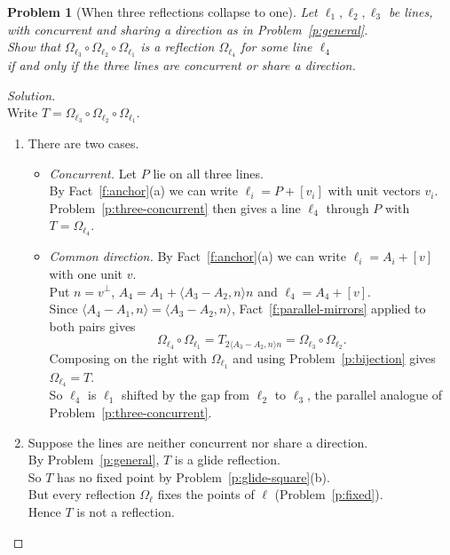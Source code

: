 \documentclass[11pt,a4paper]{article}
\theoremstyle{boxed}
\newtheorem{problem}{Problem}
\theoremstyle{definition}
\newenvironment{solution}{\begin{proof}[Solution]}{\end{proof}}
\newcommand{\ip}[2]{\langle #1, #2 \rangle}
\begin{document}
\begin{problem}[When three reflections collapse to one]\label{p:collapse}
Let $\ell_1,\ell_2,\ell_3$ be lines, with concurrent and sharing a direction as in Problem~\ref{p:general}.\\
Show that $\Omega_{\ell_3}\circ\Omega_{\ell_2}\circ\Omega_{\ell_1}$ is a reflection $\Omega_{\ell_4}$ for some line $\ell_4$\\
if and only if the three lines are concurrent or share a direction.
\end{problem}

\begin{solution}
\leavevmode\\
Write $T=\Omega_{\ell_3}\circ\Omega_{\ell_2}\circ\Omega_{\ell_1}$.
\begin{enumerate}[leftmargin=2.5em]
    \item[($\Leftarrow$)] There are two cases.
    \begin{itemize}[nosep]
        \item \emph{Concurrent.} Let $P$ lie on all three lines.\\
        By Fact~\ref{f:anchor}(a) we can write $\ell_i=P+[v_i]$ with unit vectors $v_i$.\\
        Problem~\ref{p:three-concurrent} then gives a line $\ell_4$ through $P$ with $T=\Omega_{\ell_4}$.
        \item \emph{Common direction.} By Fact~\ref{f:anchor}(a) we can write $\ell_i=A_i+[v]$ with one unit $v$.\\
        Put $n=v^\perp$, $A_4=A_1+\ip{A_3-A_2}{n}n$ and $\ell_4=A_4+[v]$.\\
        Since $\ip{A_4-A_1}{n}=\ip{A_3-A_2}{n}$, Fact~\ref{f:parallel-mirrors} applied to both pairs gives
        \[
        \Omega_{\ell_4}\circ\Omega_{\ell_1}=T_{2\ip{A_3-A_2}{n}n}=\Omega_{\ell_3}\circ\Omega_{\ell_2}.
        \]
        Composing on the right with $\Omega_{\ell_1}$ and using Problem~\ref{p:bijection} gives $\Omega_{\ell_4}=T$.\\
        So $\ell_4$ is $\ell_1$ shifted by the gap from $\ell_2$ to $\ell_3$, the parallel analogue of Problem~\ref{p:three-concurrent}.
    \end{itemize}
    \item[($\Rightarrow$)] Suppose the lines are neither concurrent nor share a direction.\\
    By Problem~\ref{p:general}, $T$ is a glide reflection.\\
    So $T$ has no fixed point by Problem~\ref{p:glide-square}(b).\\
    But every reflection $\Omega_\ell$ fixes the points of $\ell$ (Problem~\ref{p:fixed}).\\
    Hence $T$ is not a reflection. \qedhere
\end{enumerate}
\end{solution}
\end{document}
